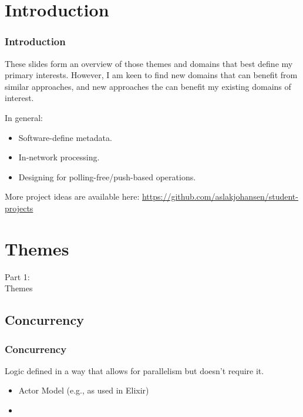 \section{Introduction}
\begin{frame}
    \frametitle{Introduction}
    \vspace{3mm}
    These slides form an overview of those themes and domains that best define my primary interests. However, I am keen to find new domains that can benefit from similar approaches, and new approaches the can benefit my existing domains of interest.
    
    \vspace{3mm}
    In general:
    \begin{itemize}
      \item Software-define metadata.
      \item In-network processing.
      \item Designing for polling-free/push-based operations.
    \end{itemize}
    
    \vspace{3mm}
    More project ideas are available here: \url{https://github.com/aslakjohansen/student-projects}
\end{frame}

\section{Themes}
\begin{frame}
    \vspace{25mm}
    \begin{center}
        \Huge{Part 1:\\Themes}
    \end{center}
\end{frame}

\subsection{Concurrency}
\begin{frame}
    \frametitle{Concurrency}
    \vspace{0mm}
    Logic defined in a way that allows for parallelism but doesn't require it.
    \vspace{3mm}
    \begin{itemize}
        \item Actor Model (e.g., as used in Elixir)
        \item 
    \end{itemize}
\end{frame}

